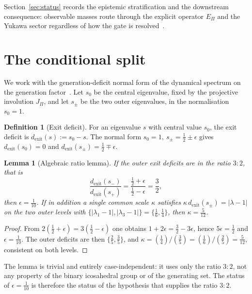\documentclass[11pt]{article}
\newtheorem{lemma}{Lemma}
\theoremstyle{definition}
\newtheorem{definition}{Definition}
\theoremstyle{remark}
\begin{document}
    Section~\ref{sec:status} records the epistemic stratification and the downstream consequence: observable masses
    route through the explicit operator $E_\Pi$ and the Yukawa sector regardless of how the gate is
    resolved~\cite{Beau2026fmnote,Beau2026prs}.

  \section{The conditional split}
    \label{sec:conditional}

    We work with the generation-deficit normal form of the dynamical spectrum on the generation
    factor~\cite{Beau2026q14}.
    Let $s_0$ be the central eigenvalue, fixed by the projective involution $J_\Pi$, and let $s_\pm$ be the two outer
    eigenvalues, in the normalisation $s_0=1$.

    \begin{definition}[Exit deficit]
For an eigenvalue $s$ with central value $s_0$, the exit deficit is $d_{\mathrm{exit}}(s):=s_0-s$.
The normal form $s_0=1,\ s_\pm=\tfrac{1}{2}\pm\epsilon$ gives
$d_{\mathrm{exit}}(s_0)=0$ and $d_{\mathrm{exit}}(s_\pm)=\tfrac{1}{2}\mp\epsilon$.
    \end{definition}

    \begin{lemma}[Algebraic ratio lemma]
      \label{lem:algebraic}
      If the outer exit deficits are in the ratio $3:2$, that is
      \[
        \frac{d_{\mathrm{exit}}(s_-)}{d_{\mathrm{exit}}(s_+)}=\frac{\tfrac{1}{2}+\epsilon}{\tfrac{1}{2}-\epsilon}=\frac{3}{2},
      \]
      then $\epsilon=\tfrac{1}{10}$.
      If in addition a single common scale $\kappa$ satisfies $\kappa\, d_{\mathrm{exit}}(s_\pm)=|\lambda-1|$ on the two
      outer levels with $\{|\lambda_1-1|,|\lambda_3-1|\}=\{\tfrac{1}{6},\tfrac{1}{4}\}$, then $\kappa=\tfrac{5}{12}$.
    \end{lemma}

    \begin{proof}
      From $2(\tfrac{1}{2}+\epsilon)=3(\tfrac{1}{2}-\epsilon)$ one obtains $1+2\epsilon=\tfrac{3}{2}-3\epsilon$, hence
      $5\epsilon=\tfrac{1}{2}$ and $\epsilon=\tfrac{1}{10}$.
      The outer deficits are then $\{\tfrac{2}{5},\tfrac{3}{5}\}$, and
      $\kappa=(\tfrac{1}{4})/(\tfrac{3}{5})=(\tfrac{1}{6})/(\tfrac{2}{5})=\tfrac{5}{12}$, consistent on both levels.
    \end{proof}

    The lemma is trivial and entirely case-independent: it uses only the ratio $3:2$, not any property of the binary
    icosahedral group or of the generating set.
    The status of $\epsilon=\tfrac{1}{10}$ is therefore the status of the hypothesis that supplies the ratio $3:2$.
\end{document}
